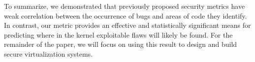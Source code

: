 To summarize, we demonstrated that previously proposed security
metrics have weak correlation between the occurrence of bugs
and areas of code they identify. In contrast, our metric 
provides an effective and statistically significant
means for predicting where in the kernel exploitable flaws
will likely be found. For the remainder of the paper, we will
focus on using this result to design and build secure virtualization systems.
